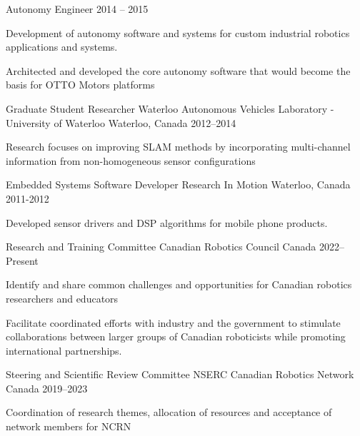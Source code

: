 \documentclass[11pt, a4paper]{awesome-cv}
\begin{document}
\begin{cventries}
\vspace*{-2mm}
\cventry
  {Autonomy Engineer} 
  {}
  {}
  {2014 -- 2015}
  {
  \begin{cvitems}
    \item Development of autonomy software and systems for custom industrial robotics applications and systems.
    \item Architected and developed the core autonomy software that would become the basis for OTTO Motors platforms
  \end{cvitems} 
  }

\cventry
  {Graduate Student Researcher} 
  {Waterloo Autonomous Vehicles Laboratory - University of Waterloo}
  {Waterloo, Canada}
  {2012--2014}
  {
    \begin{cvitems}
      \item Research focuses on improving SLAM methods by incorporating multi-channel information from non-homogeneous sensor configurations
    \end{cvitems}
  }

\cventry
  {Embedded Systems Software Developer} 
  {Research In Motion}
  {Waterloo, Canada}
  {2011-2012}
  {
  \begin{cvitems}
      \item Developed sensor drivers and DSP algorithms for mobile phone products. 
  \end{cvitems}
  }

\end{cventries}

\vspace{-4mm}
\begin{cventries}
\cventry
  {Research and Training Committee}
  {Canadian Robotics Council}
  {Canada}
  {2022--Present}
  {
    \begin{cvitems}
      \item Identify and share common challenges and opportunities for Canadian robotics researchers and educators
      \item Facilitate coordinated efforts with industry and the government to stimulate collaborations between larger groups of Canadian roboticists while promoting international partnerships.
    \end{cvitems}
  }

\vspace{-1mm}
\cventry
  {Steering and Scientific Review Committee}
  {NSERC Canadian Robotics Network}
  {Canada}
  {2019--2023}
  {
    \begin{cvitems}
      \item Coordination of research themes, allocation of resources and acceptance of network members for NCRN 
    \end{cvitems}
  }
\end{cventries}
\end{document}
